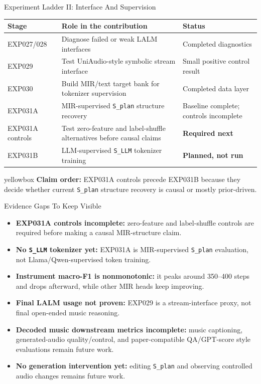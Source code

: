 \documentclass[aspectratio=169,11pt]{beamer}
\newcommand{\missing}[1]{{\color{missingred}\textbf{#1}}}
\newcommand{\code}[1]{\texttt{\footnotesize #1}}
\newenvironment{keybox}{%
  \begin{beamercolorbox}[rounded=true,sep=0.14cm,wd=\linewidth]{yellowbox}\footnotesize%
}{%
  \end{beamercolorbox}%
}
\begin{document}
\begin{frame}{Experiment Ladder II: Interface And Supervision}
  \footnotesize
  \begin{tabularx}{\linewidth}{p{2.75cm}Yp{2.45cm}}
    \toprule
    Stage & Role in the contribution & Status \\
    \midrule
    EXP027/028 & Diagnose failed or weak LALM interfaces & Completed diagnostics \\
    EXP029 & Test UniAudio-style symbolic stream interface & Small positive control result \\
    EXP030 & Build MIR/text target bank for tokenizer supervision & Completed data layer \\
    EXP031A & MIR-supervised \code{S\_plan} structure recovery & Baseline complete; controls incomplete \\
    EXP031A controls & Test zero-feature and label-shuffle alternatives before causal claims & \missing{Required next} \\
    EXP031B & LLM-supervised \code{S\_LLM} tokenizer training & \missing{Planned, not run} \\
    \bottomrule
  \end{tabularx}

  \vspace{0.18cm}
  \begin{keybox}\textbf{Claim order:} EXP031A controls precede EXP031B because they decide whether current \code{S\_plan} structure recovery is causal or mostly prior-driven.\end{keybox}
\end{frame}

\begin{frame}{Evidence Gaps To Keep Visible}
  \footnotesize
  \begin{itemize}
    \item \missing{EXP031A controls incomplete:} zero-feature and label-shuffle controls are required before making a causal MIR-structure claim.
    \item \missing{No \code{S\_LLM} tokenizer yet:} EXP031A is MIR-supervised \code{S\_plan} evaluation, not Llama/Qwen-supervised token training.
    \item \missing{Instrument macro-F1 is nonmonotonic:} it peaks around 350--400 steps and drops afterward, while other MIR heads keep improving.
    \item \missing{Final LALM usage not proven:} EXP029 is a stream-interface proxy, not final open-ended music reasoning.
    \item \missing{Decoded music downstream metrics incomplete:} music captioning, generated-audio quality/control, and paper-compatible QA/GPT-score style evaluations remain future work.
    \item \missing{No generation intervention yet:} editing \code{S\_plan} and observing controlled audio changes remains future work.
  \end{itemize}
\end{frame}
\end{document}
